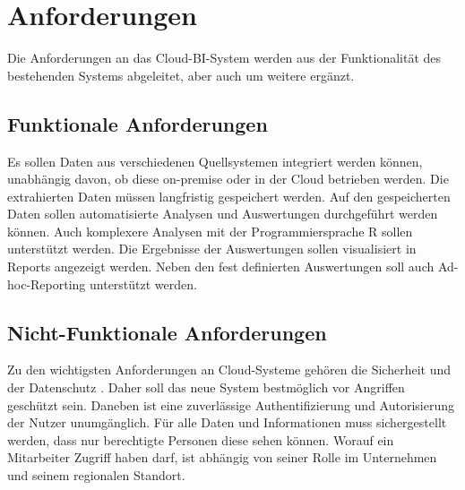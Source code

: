 \section{Anforderungen}
\label{sec:anforderungen}
Die Anforderungen an das Cloud-BI-System werden aus der Funktionalität des bestehenden Systems abgeleitet, aber auch um weitere ergänzt.

\subsection{Funktionale Anforderungen}
\label{subsec:funktionaleAnforderungen}
Es sollen Daten aus verschiedenen Quellsystemen integriert werden können, unabhängig davon, ob diese on-premise oder in der Cloud betrieben werden. Die extrahierten Daten müssen langfristig gespeichert werden. Auf den gespeicherten Daten sollen automatisierte Analysen und Auswertungen durchgeführt werden können. Auch komplexere Analysen mit der Programmiersprache R sollen unterstützt werden. Die Ergebnisse der Auswertungen sollen visualisiert in Reports angezeigt werden. Neben den fest definierten Auswertungen soll auch Ad-hoc-Reporting unterstützt werden.

\subsection{Nicht-Funktionale Anforderungen}
\label{subsec:NichtfunktionaleAnforderungen}
Zu den wichtigsten Anforderungen an Cloud-Systeme gehören die Sicherheit und der Datenschutz \cite{gurjar_cloud_2013}. Daher soll das neue System bestmöglich vor Angriffen geschützt sein. Daneben ist eine zuverlässige Authentifizierung und Autorisierung der Nutzer unumgänglich. Für alle Daten und Informationen muss sichergestellt werden, dass nur berechtigte Personen diese sehen können. Worauf ein Mitarbeiter Zugriff haben darf, ist abhängig von seiner Rolle im Unternehmen und seinem regionalen Standort.
